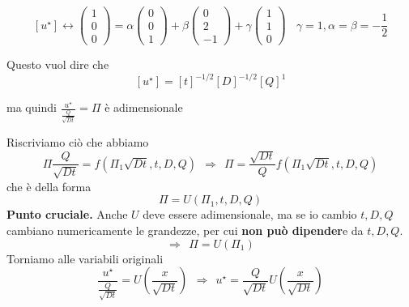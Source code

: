 \documentclass[10pt,a4paper,twoside,openright]{book}
\begin{document}
\begin{itemize}
          \begin{equation*}
              \left[ u^{\star }\right] \leftrightarrow \begin{pmatrix}
                  1 \\
                  0 \\
                  0
              \end{pmatrix} =\alpha \begin{pmatrix}
                  0 \\
                  0 \\
                  1
              \end{pmatrix} +\beta \begin{pmatrix}
                  0 \\
                  2 \\
                  -1
              \end{pmatrix} +\gamma \begin{pmatrix}
                  1 \\
                  1 \\
                  0
              \end{pmatrix} \ \ \ \ \gamma =1,\alpha =\beta =-\frac{1}{2}
          \end{equation*}

          Questo vuol dire che
          \begin{equation*}
              \left[ u^{\star }\right] =[ t]^{-1/2}[ D]^{-1/2}[ Q]^{1}
          \end{equation*}

          ma quindi $\frac{u^{\star }}{\frac{Q}{\sqrt{Dt}}} =\Pi $ è adimensionale
\end{itemize}

Riscriviamo ciò che abbiamo
\begin{equation*}
    \Pi \frac{Q}{\sqrt{Dt}} =f\left(\Pi _{1}\sqrt{Dt},t,D,Q\right) \ \ \Rightarrow \ \ \Pi =\frac{\sqrt{Dt}}{Q} f\left(\Pi _{1}\sqrt{Dt},t,D,Q\right)
\end{equation*}
che è della forma
\begin{equation*}
    \Pi =U(\Pi _{1},t,D,Q)
\end{equation*}
\textbf{Punto cruciale.} Anche $U$ deve essere adimensionale, ma se io cambio $t,D,Q$ cambiano numericamente le grandezze, per cui \textbf{non può dipender}e da $t,D,Q$.
\begin{equation*}
    \Rightarrow \ \ \Pi =U(\Pi _{1})
\end{equation*}
Torniamo alle variabili originali
\begin{equation*}
    \frac{u^{\star }}{\frac{Q}{\sqrt{Dt}}} =U\left(\frac{x}{\sqrt{Dt}}\right) \ \ \Rightarrow \ \ u^{\star } =\frac{Q}{\sqrt{Dt}} U\left(\frac{x}{\sqrt{Dt}}\right)
\end{equation*}
\end{document}
